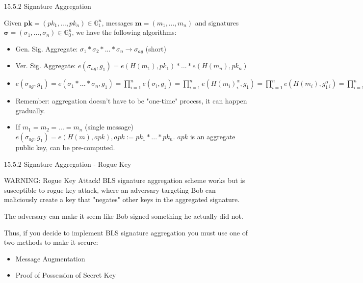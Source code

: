 \documentclass[aspectratio=169,xcolor=dvipsnames]{beamer}
\newcommand{\Go}{\mathbb{G}_0}
\newcommand{\Gi}{\mathbb{G}_1}
\begin{document}
\begin{frame}{15.5.2 Signature Aggregation}
\begin{theorem}
    Given $\textbf{pk} = (pk_1, ..., pk_n) \in \Gi^n$, messages $\textbf{m} = (m_1, ..., m_n)$ and signatures $\boldsymbol{\sigma} = (\sigma_1, ..., \sigma_n) \in \Go^n$, we have the following algorithms:
    \begin{itemize}
        \item Gen. Sig. Aggregate: $\sigma_1 * \sigma_2 * ... * \sigma_n \rightarrow \sigma_{ag}$ (short)
        \item Ver. Sig. Aggregate: $e(\sigma_{ag}, g_1) = e(H(m_1), pk_1)*...*e(H(m_n), pk_n)$
    \end{itemize}
\end{theorem}
\begin{itemize}
    \item $e(\sigma_{ag}, g_1) = e(\sigma_1 * ... * \sigma_n, g_1) = \prod^{n}_{i=1} e(\sigma_i, g_1) = \prod^{n}_{i=1} e(H(m_i)^{\alpha}_{i}, g_1) = \prod^{n}_{i=1} e(H(m_i), g_1^{\alpha}_{i}) = \prod^{n}_{i=1} e(H(m_i), pk_{i})$
    \item Remember: aggregation doesn't have to be "one-time" process, it can happen gradually.
    \item If $m_1 = m_2 = ... = m_n$ (single message) $e(\sigma_{ag}, g_1) = e(H(m), apk), apk := pk_1 * ... * pk_n$. $apk$ is an aggregate public key, can be pre-computed.
\end{itemize}
\end{frame}

\begin{frame}{15.5.2 Signature Aggregation - Rogue Key}
    \begin{alertblock}{WARNING: Rogue Key Attack!}
    BLS signature aggregation scheme works but is susceptible to rogue key attack, where an adversary targeting Bob can maliciously create a key that "negates" other keys in the aggregated signature.

    The adversary can make it seem like Bob signed something he actually did not.

    Thus, if you decide to implement BLS signature aggregation you must use one of two methods to make it secure:
    \begin{itemize}
        \item Message Augmentation
        \item Proof of Possession of Secret Key
    \end{itemize}
\end{alertblock}
\end{frame}
\end{document}
